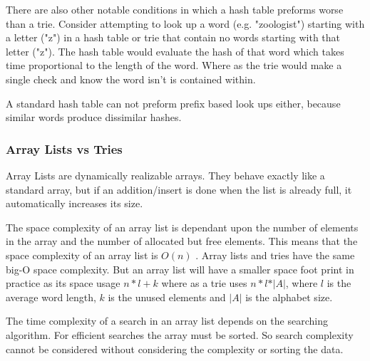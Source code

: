 \documentclass[10pt]{article} %
\begin{document}
			    There are also other notable conditions in which a hash table preforms worse than a trie. Consider attempting to look up a word (e.g. "zoologist") starting with a letter ("z") in a hash table or trie that contain no words starting with that letter ("z"). The hash table would evaluate the hash of that word which takes time proportional to the length of the word. Where as the trie would make a single check and know the word isn't is contained within.
			    
			    A standard hash table can not preform prefix based look ups either, because similar words produce dissimilar hashes.
			    
			    
			    
			\subsubsection{Array Lists vs Tries}
			    Array Lists are dynamically realizable arrays. They behave exactly like a standard array, but if an addition/insert is done when the list is already full, it automatically increases its size.
			    
			    The space complexity of an array list is dependant upon the number of elements in the array and the number of allocated but free elements. This means that the space complexity of an array list is 
			    \begin{math} O(n) \end{math} . Array lists and tries have the same big-O space complexity. But an array list will have a smaller space foot print in practice as its space usage \begin{math} n * l + k \end{math} where as a trie uses \begin{math} n * l * \vert A \vert \end{math}, where \begin{math} l \end{math} is the average word length, \begin{math} k \end{math} is the unused elements and \begin{math} \vert A \vert \end{math} is the alphabet size.
			    
			    The time complexity of a search in an array list depends on the searching algorithm. For efficient searches the array must be sorted. So search complexity cannot be considered without considering the complexity or sorting the data.
			    
\end{document}
